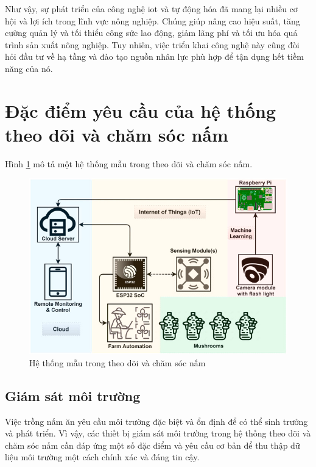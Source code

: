 Như vậy, sự phát triển của công nghệ \acrshort{iot} và tự động hóa đã mang lại nhiều cơ hội và lợi ích trong lĩnh vực nông nghiệp. Chúng giúp nâng cao hiệu suất, tăng cường quản lý và tối thiểu công sức lao động, giảm lãng phí và tối ưu hóa quá trình sản xuất nông nghiệp. Tuy nhiên, việc triển khai công nghệ này cũng đòi hỏi đầu tư về hạ tầng và đào tạo nguồn nhân lực phù hợp để tận dụng hết tiềm năng của nó.


\section{Đặc điểm yêu cầu của hệ thống theo dõi và chăm sóc nấm}

Hình \ref{fig:system-example} mô tả một hệ thống mẫu trong theo dõi và chăm sóc nấm. 

\begin{figure}[h]
	\centering
	\includegraphics[width=0.5\linewidth]{images/system-example.png}
	\caption{Hệ thống mẫu trong theo dõi và chăm sóc nấm \cite{RAHMAN2022100267}}
	\label{fig:system-example}
\end{figure}

\subsection{Giám sát môi trường}

Việc trồng nấm ăn yêu cầu môi trường đặc biệt và ổn định để có thể sinh trưởng và phát triển. Vì vậy, các thiết bị giám sát môi trường trong hệ thống theo dõi và chăm sóc nấm cần đáp ứng một số đặc điểm và yêu cầu cơ bản để thu thập dữ liệu môi trường một cách chính xác và đáng tin cậy.

